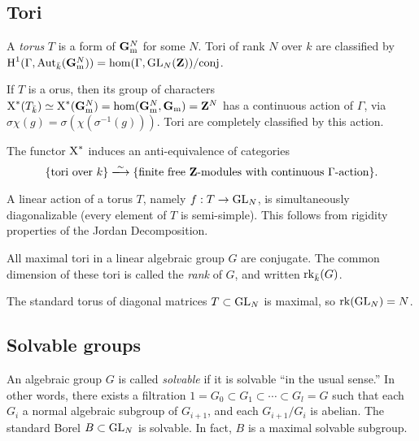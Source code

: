 \subsection{Tori}

A \emph{torus} $T$ is a form of $\mathbf{G}_{\mathrm{m}}^N$ for some $N$. Tori of 
rank $N$ over $k$ are classified by 
$\operatorname{H}^1(\Gamma,\operatorname{Aut}_{\bar k}(\mathbf{G}_{\mathrm{m}}^N)) = \hom(\Gamma,\operatorname{GL}_N(\mathbf{Z}))/\text{conj}$. 

If $T$ is a orus, then its group of characters 
$\operatorname{X}^\ast(T_{\bar k}) \simeq \operatorname{X}^\ast(\mathbf{G}_{\mathrm{m}}^N) = \hom(\mathbf{G}_{\mathrm{m}}^N,\mathbf{G}_{\mathrm{m}}) = \mathbf{Z}^N$ 
has a continuous action of $\Gamma$, via 
$\sigma \chi(g) = \sigma(\chi(\sigma^{-1}(g)))$. Tori are completely classified 
by this action. 

\begin{theo}
The functor $\operatorname{X}^\ast$ induces an anti-equivalence of categories 
\[
  \{\text{tori over }k\} \iso \{\text{finite free $\dZ$-modules with continuous $\Gamma$-action}\} .
\]
\end{theo}

A linear action of a torus $T$, namely $f:T\to \operatorname{GL}_N$, is 
simultaneously diagonalizable (every element of $T$ is semi-simple). This 
follows from rigidity properties of the Jordan Decomposition. 

All maximal tori in a linear algebraic group $G$ are conjugate. The common 
dimension of these tori is called the \emph{rank} of $G$, and written 
$\operatorname{rk}_{\bar k}(G)$. 

\begin{example}
The standard torus of diagonal matrices $T\subset\operatorname{GL}_N$ is 
maximal, so $\operatorname{rk}(\operatorname{GL}_N) = N$. 
\end{example}





\subsection{Solvable groups}

An algebraic group $G$ is called \emph{solvable} if it is solvable ``in the 
usual sense.'' In other words, there exists a filtration 
$1=G_0\subset G_1\subset \cdots \subset G_l = G$ such that each 
$G_i$ a normal algebraic subgroup of $G_{i+1}$, and each 
$G_{i+1}/G_i$ is abelian. The standard Borel $B\subset \operatorname{GL}_N$ is 
solvable. In fact, $B$ is a maximal solvable subgroup. 

